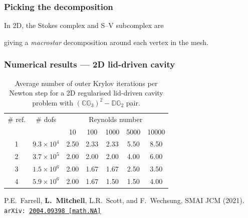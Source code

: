 \documentclass[presentation,aspectratio=43, 10pt]{beamer}
\newcommand{\arxivlink}[2]{{\texttt{arXiv:\,\href{https://arxiv.org/abs/#1}{#1\,[#2]}}}}
\let\div\relax
\DeclareMathOperator{\div}{div}
\DeclareMathOperator{\curl}{curl}
\begin{document}
\begin{frame}[fragile]
  \frametitle{Picking the decomposition}
  In 2D, the Stokes complex and S--V subcomplex are
  \begin{center}
    
  \end{center}
  giving a \emph{macrostar} decomposition around each vertex in the mesh.
  \begin{center}
    
  \end{center}
\end{frame}
\begin{frame}
  \frametitle{Numerical results --- 2D lid-driven cavity}
  \begin{table}[htbp]
    \centering
    \begin{tabular}{cc|ccccc}
      \toprule
      \# ref. & \# dofs & \multicolumn{5}{c}{Reynolds number} \\
              && 10 & 100 & 1000 & 5000 & 10000 \\
      \midrule
      1 & $9.3 \times 10^4$ & 2.50 & 2.33 & 2.33 & 5.50 & 8.50 \\
      2 & $3.7 \times 10^5$ & 2.00 & 2.00 & 2.00 & 4.00 & 6.00 \\
      3 & $1.5 \times 10^6$ & 2.00 & 1.67 & 1.67 & 2.50 & 3.50 \\
      4 & $5.9 \times 10^6$ & 2.00 & 1.67 & 1.50 & 1.50 & 4.00 \\
      \bottomrule
    \end{tabular}
    \caption{Average number of outer Krylov iterations per Newton step
      for a 2D regularised lid-driven cavity problem with
      $(\mathbb{CG}_3)^{2}-\mathbb{DG}_2$ pair.}
  \end{table}
  \begin{flushright}
    {\scriptsize
    P.E.~Farrell, \textbf{L.~Mitchell}, L.R.~Scott, and F.~Wechsung,
    SMAI JCM (2021).
    \arxivlink{2004.09398}{math.NA}\nocite{Farrell:2021a}
    }
  \end{flushright}
\end{frame}
\end{document}
